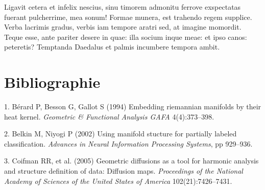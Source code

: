 \documentclass[9pt,twocolumn,twoside,]{pnas-new}
\newenvironment{cslreferences}%
  {}%
  {\par}
\begin{document}
Ligavit cetera et infelix nescius, sinu timorem admonitu ferrove
exspectatas fuerant pulcherrime, mea sonum! Formae munera, est trahendo
regem supplice. Verba lacrimis gradus, verbis iam tempore aratri sed, at
imagine momordit. Teque esse, ante pariter desere in quae: illa socium
inque meae: et ipso canos: peteretis? Temptanda Daedalus et palmis
incumbere tempora ambit.

\newpage

\hypertarget{bibliographie}{%
\section*{Bibliographie}\label{bibliographie}}

\hypertarget{refs}{}
\begin{cslreferences}
\leavevmode\hypertarget{ref-berard1994embedding}{}%
1. Bérard P, Besson G, Gallot S (1994) Embedding riemannian manifolds by
their heat kernel. \emph{Geometric \& Functional Analysis GAFA}
4(4):373--398.

\leavevmode\hypertarget{ref-belkin2002using}{}%
2. Belkin M, Niyogi P (2002) Using manifold stucture for partially
labeled classification. \emph{Advances in Neural Information Processing
Systems}, pp 929--936.

\leavevmode\hypertarget{ref-coifman2005geometric}{}%
3. Coifman RR, et al. (2005) Geometric diffusions as a tool for harmonic
analysis and structure definition of data: Diffusion maps.
\emph{Proceedings of the National Academy of Sciences of the United
States of America} 102(21):7426--7431.
\end{cslreferences}



% 
\end{document}
